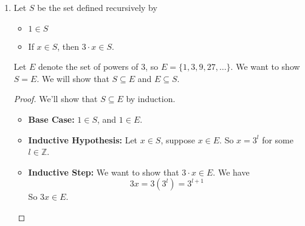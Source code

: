 \documentclass[openany]{report}
\begin{document}
\begin{enumerate}[label=(\alph*)]
    \begin{proof}
        We will show $S \subseteq E$ by induction.
        \begin{itemize}
            \item \textbf{Base Case:} $5 \in S$, and $5 \in E$.
            \item \textbf{Inductive Hypothesis:} Let $x,y \in S$, suppose $x,y \in E$. So $x = 5l$ and $y = 5k$ for some $l,k \in \mathbb{Z}$. 
            \item \textbf{Inductive Step:} We want to show that $x + y \in E$. We have 
            \[x + y = 5l + 5k = 5(l+k)\]
            So $x + y \in E$.
        \end{itemize}
        Now to show $E \subseteq S$, 
        \begin{itemize}
            \item \textbf{Base Case:} $5 \in E$, and $5 \in S$.
            \item \textbf{Inductive Hypothesis:} Let $m \in E$, suppose $m \in S$.
            \item \textbf{Inductive Step:} We want to show that $m + 5 \in S$, by the induction hypthosis $m \in S$, from the base case $5 \in S$. So by the definition of $S$, we have that $m + 5 \in S$.
        \end{itemize}
        Therefore $S = E$.
    \end{proof}
    \item Let $S$ be the set defined recursively by
    \begin{itemize}
        \item $1 \in S$
        \item If $x \in S$, then $3 \cdot x \in S$.
    \end{itemize}
    Let $E$ denote the set of powers of 3, so $E = \{1,3,9,27,\ldots\}$. We want to show $S = E$. We will show that $S \subseteq E$ and $E \subseteq S$.
    \begin{proof}
        We'll show that $S \subseteq E$ by induction.
        \begin{itemize}
            \item \textbf{Base Case:} $1 \in S$, and $1 \in E$.
            \item \textbf{Inductive Hypothesis:} Let $x \in S$, suppose $x \in E$. So $x = 3^l$ for some $l \in \mathbb{Z}$.
            \item \textbf{Inductive Step:} We want to show that $3 \cdot x \in E$. We have
            \[3x = 3(3^l) = 3^{l+1}\]
            So $3x \in E$.

\end{itemize}
\end{proof}
\end{enumerate}
\end{document}
